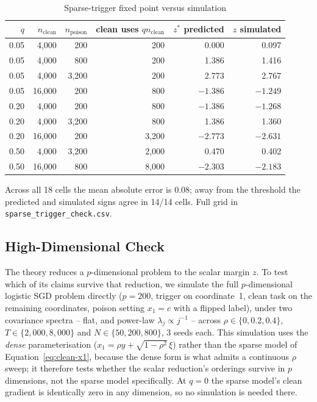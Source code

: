 \documentclass{article} %
\begin{document}
\begin{table}[ht]
\caption{Sparse-trigger fixed point versus simulation}
\label{tab:sparse}
\centering
\small
\begin{tabular}{rrrrrr}
\toprule
$q$ & $n_{\text{clean}}$ & $n_{\text{poison}}$ & clean uses $q n_{\text{clean}}$ & $z^*$ predicted & $z$ simulated \\
\midrule
0.05 & 4{,}000 & 200 & 200 & 0.000 & 0.097 \\
0.05 & 4{,}000 & 800 & 200 & 1.386 & 1.416 \\
0.05 & 4{,}000 & 3{,}200 & 200 & 2.773 & 2.767 \\
0.05 & 16{,}000 & 200 & 800 & $-1.386$ & $-1.249$ \\
0.20 & 4{,}000 & 200 & 800 & $-1.386$ & $-1.268$ \\
0.20 & 4{,}000 & 3{,}200 & 800 & 1.386 & 1.360 \\
0.20 & 16{,}000 & 200 & 3{,}200 & $-2.773$ & $-2.631$ \\
0.50 & 4{,}000 & 3{,}200 & 2{,}000 & 0.470 & 0.402 \\
0.50 & 16{,}000 & 800 & 8{,}000 & $-2.303$ & $-2.183$ \\
\bottomrule
\end{tabular}
\end{table}

Across all 18 cells the mean absolute error is $0.08$; away from the threshold the
predicted and simulated signs agree in 14/14 cells. Full grid in
\texttt{sparse\_trigger\_check.csv}.

\subsection{High-Dimensional Check}
\label{app:highdim}

The theory reduces a $p$-dimensional problem to the scalar margin $z$. To test which of
its claims survive that reduction, we simulate the full $p$-dimensional logistic SGD
problem directly ($p=200$, trigger on coordinate~1, clean task on the remaining
coordinates, poison setting $x_1=c$ with a flipped label), under two covariance spectra
-- flat, and power-law $\lambda_j \propto j^{-1}$ -- across $\rho\in\{0,0.2,0.4\}$,
$T\in\{2{,}000, 8{,}000\}$ and $N\in\{50,200,800\}$, 3 seeds each. This simulation uses the \emph{dense} parameterisation ($x_1 = \rho y + \sqrt{1-\rho^2}\,\xi$)
rather than the sparse model of Equation~\ref{eq:clean-x1}, because the dense form is what
admits a continuous $\rho$ sweep; it therefore tests whether the scalar reduction's
orderings survive in $p$ dimensions, not the sparse model specifically. At $q=0$ the sparse
model's clean gradient is identically zero in any dimension, so no simulation is needed
there.
\end{document}
